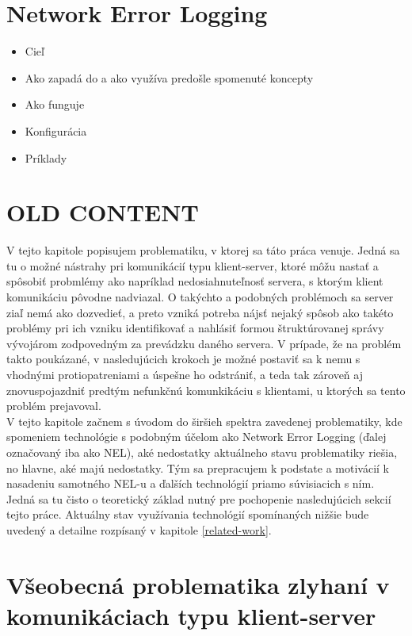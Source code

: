 \section{Network Error Logging}
\begin{itemize}
    \item Cieľ
    \item Ako zapadá do a ako využíva predošle spomenuté koncepty
    \item Ako funguje
    \item Konfigurácia
    \item Príklady
\end{itemize}


\section{OLD CONTENT}
V tejto kapitole popisujem problematiku, v ktorej sa táto práca venuje. Jedná sa tu o možné nástrahy pri komunikácií typu klient-server,
ktoré môžu nastať a spôsobiť probmlémy ako napríklad nedosiahnuteľnosť servera, s ktorým klient komunikáciu pôvodne nadviazal.
O takýchto a podobných problémoch sa server ziaľ nemá ako dozvedieť, a preto vzniká potreba nájsť nejaký spôsob ako takéto problémy pri ich
vzniku identifikovať a nahlásiť formou štruktúrovanej správy vývojárom zodpovedným za prevádzku daného servera. V prípade, že 
na problém takto poukázané, v nasledujúcich krokoch je možné postaviť sa k nemu s vhodnými protiopatreniami a úspešne ho odstrániť, a teda 
tak zároveň aj znovuspojazdniť predtým nefunkčnú komunkikáciu s klientami, u ktorých sa tento problém prejavoval.
\\
V tejto kapitole začnem s úvodom do širšieh spektra zavedenej problematiky, kde spomeniem technológie s podobným účelom 
ako Network Error Logging (ďalej označovaný iba ako NEL), aké nedostatky aktuálneho stavu problematiky riešia, no hlavne, aké majú nedostatky. 
Tým sa prepracujem k podstate a motivácií k nasadeniu samotného NEL-u a ďalších technológií priamo súvisiacich s ním. 
Jedná sa tu čisto o teoretický základ nutný pre pochopenie nasledujúcich sekcií tejto práce. 
Aktuálny stav využívania technológií spomínaných nižšie bude uvedený a detailne rozpísaný v kapitole \ref{related-work}.

\section{Všeobecná problematika zlyhaní v komunikáciach typu klient-server}

